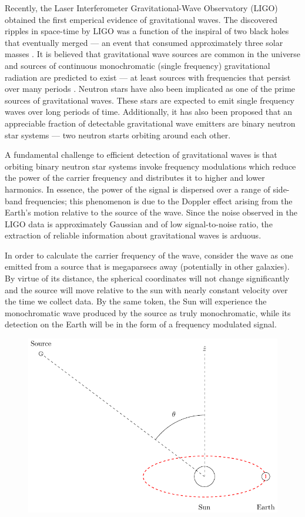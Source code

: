 \documentclass[onecolumn, groupedaddress, 10pt]{revtex4-1}
\begin{document}
Recently, the Laser Interferometer Gravitational-Wave Observatory (LIGO) obtained the first emperical evidence of gravitational waves. The discovered ripples in space-time by LIGO was a function of the inspiral of two black holes that eventually merged --- an event that consumed approximately three solar masses \citep{abbott}.  It is believed that gravitational wave sources are common in the universe and sources of continuous monochromatic (single frequency) gravitational radiation are predicted to exist --- at least sources with frequencies that persist over many periods \cite{magalhaes1995determination}. Neutron stars have also been implicated as one of the prime sources of gravitational waves.  These stars are expected to emit single frequency waves over long periods of time.  Additionally, it has also been proposed that an appreciable fraction of detectable gravitational wave emitters are binary neutron star systems --- two neutron starts orbiting around each other.

A fundamental challenge to efficient detection of gravitational waves is that orbiting binary neutron star systems invoke frequency modulations which reduce the power of the carrier frequency and distributes it to higher and lower harmonics.  In essence, the power of the signal is dispersed over a range of side-band frequencies; this phenomenon is due to the Doppler effect arising from the Earth's motion relative to the source of the wave. Since the noise observed in the LIGO data is approximately Gaussian and of low signal-to-noise ratio, the extraction of reliable information about gravitational waves is arduous.

In order to calculate the carrier frequency of the wave, consider the wave as one emitted from a source that is megaparsecs away (potentially in other galaxies). By virtue of its distance, the spherical coordinates will not change significantly and the source will move relative to the sun with nearly constant velocity over the time we collect data. By the same token, the Sun will experience the monochromatic wave produced by the source as truly monochromatic, while its detection on the Earth will be in the form of a frequency modulated signal.

\begin{figure}[ht]
	\centering
	\includegraphics[width=.75\linewidth]{earthMotionModulationFigure.pdf}
	\caption{\label{fig:earthMotionModulationFigure}}
\end{figure}
\end{document}
